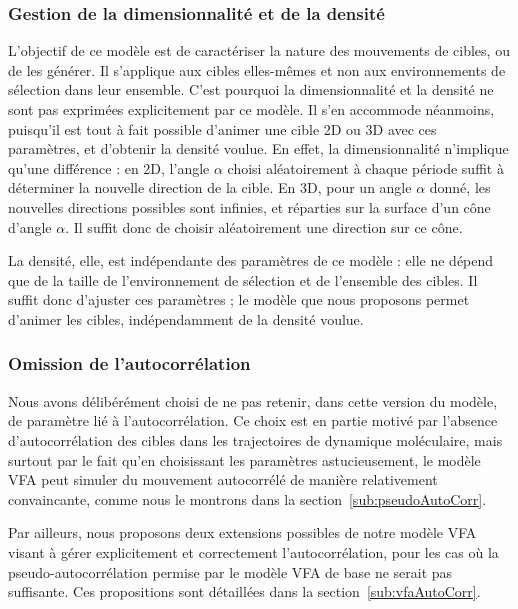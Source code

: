 	\subsubsection{Gestion de la dimensionnalité et de la densité}
	L'objectif de ce modèle est de caractériser la nature des mouvements de cibles, ou de les générer. Il s'applique aux cibles elles-mêmes et non aux environnements de sélection dans leur ensemble. C'est pourquoi la dimensionnalité et la densité ne sont pas exprimées explicitement par ce modèle. Il s'en accommode néanmoins, puisqu'il est tout à fait possible d'animer une cible 2D ou 3D avec ces paramètres, et d'obtenir la densité voulue. En effet, la dimensionnalité n'implique qu'une différence : en 2D, l'angle $\alpha$ choisi aléatoirement à chaque période suffit à déterminer la nouvelle direction de la cible. En 3D, pour un angle $\alpha$ donné, les nouvelles directions possibles sont infinies, et réparties sur la surface d'un cône d'angle $\alpha$. Il suffit donc de choisir aléatoirement une direction sur ce cône.
	
	La densité, elle, est indépendante des paramètres de ce modèle : elle ne dépend que de la taille de l'environnement de sélection et de l'ensemble des cibles. Il suffit donc d'ajuster ces paramètres ; le modèle que nous proposons permet d'animer les cibles, indépendamment de la densité voulue.
	
	\subsubsection{Omission de l'autocorrélation}
	Nous avons délibérément choisi de ne pas retenir, dans cette version du modèle, de paramètre lié à l'autocorrélation. Ce choix est en partie motivé par l'absence d'autocorrélation des cibles dans les trajectoires de dynamique moléculaire, mais surtout par le fait qu'en choisissant les paramètres astucieusement, le modèle VFA peut simuler du mouvement autocorrélé de manière relativement convaincante, comme nous le montrons dans la section~\ref{sub:pseudoAutoCorr}.
	
	Par ailleurs, nous proposons deux extensions possibles de notre modèle VFA visant à gérer explicitement et correctement l'autocorrélation, pour les cas où la pseudo-autocorrélation permise par le modèle VFA de base ne serait pas suffisante. Ces propositions sont détaillées dans la section~\ref{sub:vfaAutoCorr}.
	
